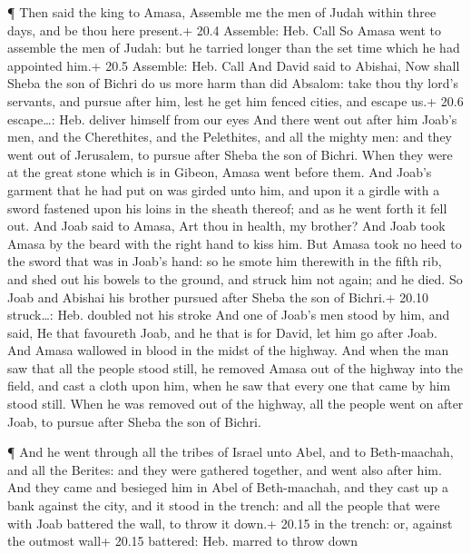  ¶ Then said the king to Amasa, Assemble me the men of Judah
within three days, and be thou here present.+ 20.4 Assemble: Heb. Call
 So Amasa went to assemble the men of Judah: but he tarried
longer than the set time which he had appointed him.+ 20.5 Assemble:
Heb. Call  And David said to Abishai, Now shall Sheba the
son of Bichri do us more harm than did Absalom: take thou thy lord's
servants, and pursue after him, lest he get him fenced cities, and
escape us.+ 20.6 escape\ldots: Heb. deliver himself from our eyes
 And there went out after him Joab's men, and the
Cherethites, and the Pelethites, and all the mighty men: and they went
out of Jerusalem, to pursue after Sheba the son of Bichri. 
When they were at the great stone which is in Gibeon, Amasa went before
them. And Joab's garment that he had put on was girded unto him, and
upon it a girdle with a sword fastened upon his loins in the sheath
thereof; and as he went forth it fell out.  And Joab said to
Amasa, Art thou in health, my brother? And Joab took Amasa by the beard
with the right hand to kiss him.  But Amasa took no heed to
the sword that was in Joab's hand: so he smote him therewith in the
fifth rib, and shed out his bowels to the ground, and struck him not
again; and he died. So Joab and Abishai his brother pursued after Sheba
the son of Bichri.+ 20.10 struck\ldots: Heb. doubled not his stroke
 And one of Joab's men stood by him, and said, He that
favoureth Joab, and he that is for David, let him go after Joab.
 And Amasa wallowed in blood in the midst of the highway.
And when the man saw that all the people stood still, he removed Amasa
out of the highway into the field, and cast a cloth upon him, when he
saw that every one that came by him stood still.  When he
was removed out of the highway, all the people went on after Joab, to
pursue after Sheba the son of Bichri.

 ¶ And he went through all the tribes of Israel unto Abel,
and to Beth-maachah, and all the Berites: and they were gathered
together, and went also after him.  And they came and
besieged him in Abel of Beth-maachah, and they cast up a bank against
the city, and it stood in the trench: and all the people that were with
Joab battered the wall, to throw it down.+ 20.15 in the trench: or,
against the outmost wall+ 20.15 battered: Heb. marred to throw down

